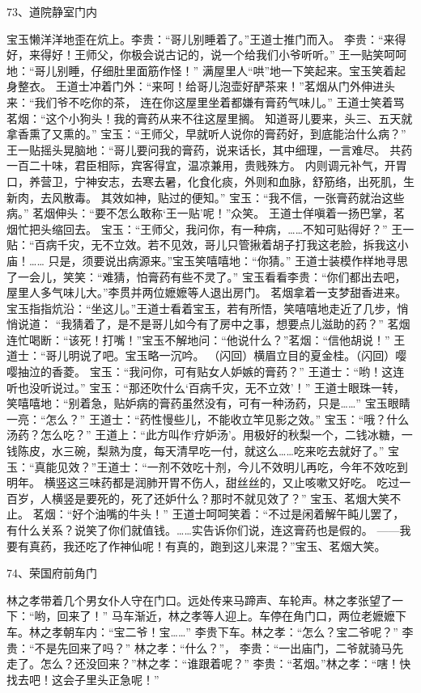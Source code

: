 73、道院静室门内\par
宝玉懒洋洋地歪在炕上。李贵：“哥儿别睡着了。”王道士推门而入。
李贵：“来得好，来得好！王师父，你极会说古记的，说一个给我们小爷听听。”
王一贴笑呵呵地：“哥儿别睡，仔细肚里面筋作怪！”
满屋里人“哄”地一下笑起来。宝玉笑着起身整衣。
王道士冲着门外：“来呵！给哥儿泡壶好酽茶来！”茗烟从门外伸进头来：“我们爷不吃你的茶，
连在你这屋里坐着都嫌有膏药气味儿。”
王道士笑着骂茗烟：“这个小狗头！我的膏药从来不往这屋里搁。
知道哥儿要来，头三、五天就拿香熏了又熏的。”
宝玉：“王师父，早就听人说你的膏药好，到底能治什么病？”
王一贴摇头晃脑地：“哥儿要问我的膏药，说来话长，其中细理，一言难尽。
共药一百二十味，君臣相际，宾客得宜，温凉兼用，贵贱殊方。
内则调元补气，开胃口，养营卫，宁神安志，去寒去暑，化食化痰，外则和血脉，舒筋络，出死肌，生新肉，去风散毒。
其效如神，贴过的便知。”
宝玉：“我不信，一张膏药就治这些病。”
茗烟伸头：“要不怎么敢称‘王一贴’呢！”众笑。
王道士佯嗔着一扬巴掌，茗烟忙把头缩回去。
宝玉：“王师父，我问你，有一种病，……不知可贴得好？”
王一贴：“百病千灾，无不立效。若不见效，哥儿只管揪着胡子打我这老脸，拆我这小庙！……
只是，须要说出病源来。”宝玉笑嘻嘻地：“你猜。”
王道士装模作样地寻思了一会儿，笑笑：“难猜，怕膏药有些不灵了。”
宝玉看看李贵：“你们都出去吧，屋里人多气味儿大。”李贯并两位嬷嬷等人退出房门。
茗烟拿着一支梦甜香进来。宝玉指指炕沿：“坐这儿。”王道士看着宝玉，若有所悟，笑嘻嘻地走近了几步，悄悄说道：
“我猜着了，是不是哥儿如今有了房中之事，想要点儿滋助的药？”
茗烟连忙喝断：“该死！打嘴！”宝玉不解地问：“他说什么？”茗烟：“信他胡说！”
王道士：“哥儿明说了吧。宝玉略一沉吟。
（闪回）横眉立目的夏金桂。（闪回）嘤嘤抽泣的香菱。
宝玉：“我问你，可有贴女人妒嫉的膏药？”
王道士：“哟！这连听也没听说过。”
宝玉：“那还吹什么‘百病千灾，无不立效’！”
王道士眼珠一转，笑嘻嘻地：“别着急，贴妒病的膏药虽然没有，可有一种汤药，只是……”
宝玉眼睛一亮：“怎么？”
王道士：“药性慢些儿，不能收立竿见影之效。”
宝玉：“哦？什么汤药？怎么吃？”
王道上：“此方叫作‘疗妒汤’。用极好的秋梨一个，二钱冰糖，一钱陈皮，水三碗，梨熟为度，每天清早吃一付，就这么……吃来吃去就好了。”
宝玉：“真能见效？”王道士：“一剂不效吃十剂，今儿不效明儿再吃，今年不效吃到明年。
横竖这三味药都是润肺开胃不伤人，甜丝丝的，又止咳嗽又好吃。
吃过一百岁，人横竖是要死的，死了还妒什么？那时不就见效了？”
宝玉、茗烟大笑不止。
茗烟：“好个油嘴的牛头！”
王道士呵呵笑着：“不过是闲着解午盹儿罢了，有什么关系？说笑了你们就值钱。……实告诉你们说，连这膏药也是假的。
——我要有真药，我还吃了作神仙呢！有真的，跑到这儿来混？”宝玉、茗烟大笑。

74、荣国府前角门\par
林之孝带着几个男女仆人守在门口。远处传来马蹄声、车轮声。林之孝张望了一下：“哟，回来了！”
马车渐近，林之孝等人迎上。车停在角门口，两位老嬷嬷下车。林之孝朝车内：“宝二爷！宝……”
李贵下车。林之孝：“怎么？宝二爷呢？”
李贵：“不是先回来了吗？”
林之孝：“什么？”，
李贵：“一出庙门，二爷就骑马先走了。怎么？还没回来？”林之孝：“谁跟着呢？”
李贵：“茗烟。”林之孝：“嗐！快找去吧！这会子里头正急呢！”

